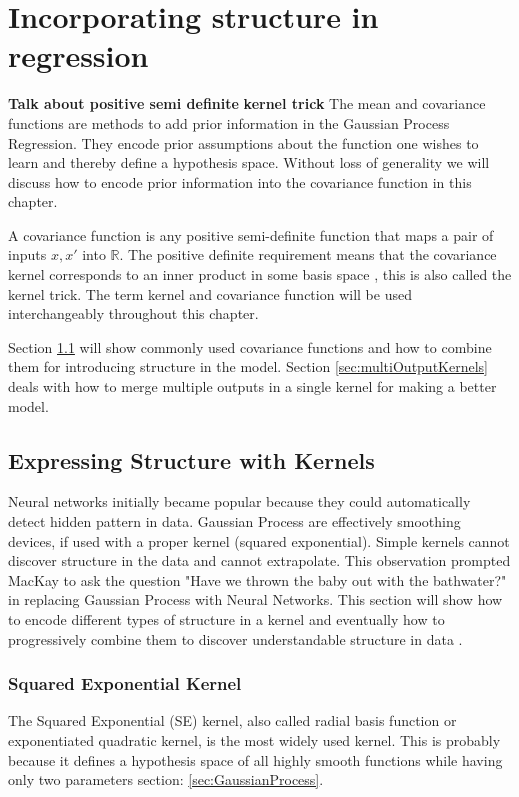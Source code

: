 \chapter{Incorporating structure in regression}
\label{chapStructureWithCovariance}

\textbf{Talk about positive semi definite}
\textbf{kernel trick}
The mean and covariance functions are methods to add prior information in the Gaussian Process Regression. They encode prior assumptions about the function one wishes to learn and thereby define a hypothesis space. Without loss of generality we will discuss how to encode prior information into the covariance function in this chapter. 

A covariance function is any positive semi-definite function that maps a pair of inputs $x, x'$ into $\mathbb{R}$. The positive definite requirement means that the covariance kernel corresponds to an inner product in some basis space \cite{bishop2006pattern}, this is also called the kernel trick. The term kernel and covariance function will be used interchangeably throughout this chapter.

Section \ref{sec:covStructure} will show commonly used covariance functions and how to combine them for introducing structure in the model. Section \ref{sec:multiOutputKernels} deals with how to merge multiple outputs in a single kernel for making a better model.

\section{Expressing Structure with Kernels} \label{sec:covStructure}
Neural networks initially became popular because they could automatically detect hidden pattern in data. Gaussian Process are effectively smoothing devices, if used with a proper kernel (squared exponential). Simple kernels cannot discover structure in the data and cannot extrapolate. This observation prompted MacKay \cite{mackay2003information} to ask the question "Have we thrown the baby out with the bathwater?" in replacing Gaussian Process with Neural Networks. This section will show how to encode different types of structure in a kernel and eventually how to progressively combine them to discover understandable structure in data \cite{duvenaud-thesis-2014}.



\subsection{Squared Exponential Kernel}
The Squared Exponential (SE) kernel, also called radial basis function or exponentiated quadratic kernel, is the most widely used kernel. This is probably because it defines a hypothesis space of all highly smooth functions while having only two parameters section: \ref{sec:GaussianProcess}.

